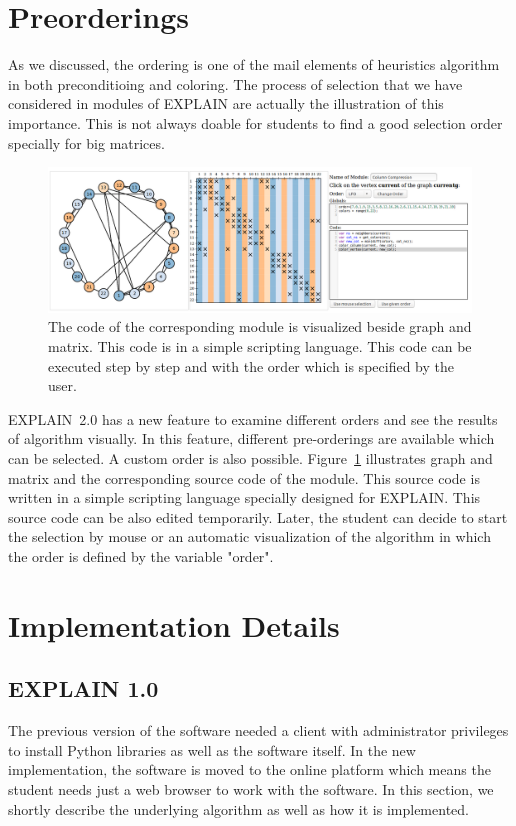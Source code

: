 \documentclass[12pt, oneside]{book}
\begin{document}
\section{Preorderings}
As we discussed, the ordering is one of the mail elements of heuristics algorithm
in both preconditioing and coloring. The process of selection that we have
considered in modules of \mbox{EXPLAIN} are actually the illustration of this importance.
This is not always doable for students to find a good selection order specially for
big matrices.
\begin{figure}
\centering
\includegraphics[width=\textwidth]{custom_module}
\caption{The code of the corresponding module is visualized beside 
graph and matrix. This code is in a simple scripting language. 
This code can be executed step by step and with the order which
is specified by the user.}
\label{f.custom_module}
\end{figure}

\mbox{EXPLAIN 2.0} has a new feature to examine different orders 
and see the results of algorithm visually. In this feature, different
pre-orderings are available which can be selected. A custom order is 
also possible. Figure~\ref{f.custom_module} illustrates graph and matrix
and the corresponding source code of the module. This source code
is written in a simple scripting language specially designed for \mbox{EXPLAIN}.
This source code can be also edited temporarily. Later, the student can
decide to start the selection by mouse or an automatic visualization
of the algorithm in which the order is defined by the variable "order".

\section{Implementation Details}
\label{s.impl.explain}
\subsection{EXPLAIN 1.0}
\label{s.impl.explain1}
The previous version of the software \cite{Lulfesmann2010} needed a client with administrator privileges to install Python libraries as well as the software itself. In the new implementation, the software is moved to the online platform which means the student needs just a web browser to work with the software. In this section, we shortly describe the underlying algorithm as well as how it is implemented.
\end{document}
